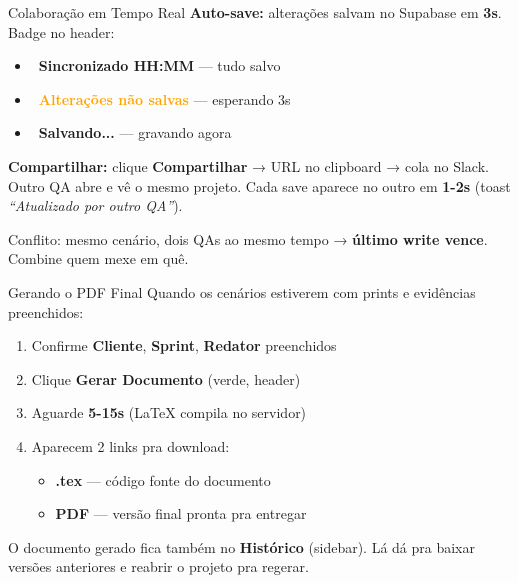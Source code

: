 \documentclass[aspectratio=169,12pt]{beamer}
\begin{document}
\begin{frame}{Colaboração em Tempo Real}
  \small
  \textbf{Auto-save:} alterações salvam no Supabase em \textbf{3s}. Badge no header:
  \begin{itemize}
    \item \textcolor{peGreen}{\faCheckCircle~\textbf{Sincronizado HH:MM}} — tudo salvo
    \item \textcolor{orange}{\faExclamationCircle~\textbf{Alterações não salvas}} — esperando 3s
    \item \textcolor{peMuted}{\faSync~\textbf{Salvando...}} — gravando agora
  \end{itemize}

  \vspace{0.4em}
  \textbf{Compartilhar:} clique \textbf{Compartilhar} → URL no clipboard → cola no Slack. Outro QA abre e vê o mesmo projeto. Cada save aparece no outro em \textbf{1-2s} (toast \textit{``Atualizado por outro QA''}).

  \vspace{0.3em}
  \begin{atencao}
    Conflito: mesmo cenário, dois QAs ao mesmo tempo → \textbf{último write vence}. Combine quem mexe em quê.
  \end{atencao}
\end{frame}

\begin{frame}{Gerando o PDF Final}
  Quando os cenários estiverem com prints e evidências preenchidos:

  \vspace{0.8em}
  \begin{enumerate}
    \item Confirme \textbf{Cliente}, \textbf{Sprint}, \textbf{Redator} preenchidos
    \item Clique \textbf{Gerar Documento} (verde, header)
    \item Aguarde \textbf{5-15s} (LaTeX compila no servidor)
    \item Aparecem 2 links pra download:
    \begin{itemize}
      \item \textbf{.tex} — código fonte do documento
      \item \textbf{PDF} — versão final pronta pra entregar
    \end{itemize}
  \end{enumerate}

  \vspace{0.8em}
  \begin{dica}
    O documento gerado fica também no \textbf{Histórico} (sidebar). Lá dá pra baixar versões anteriores e reabrir o projeto pra regerar.
  \end{dica}
\end{frame}
\end{document}

